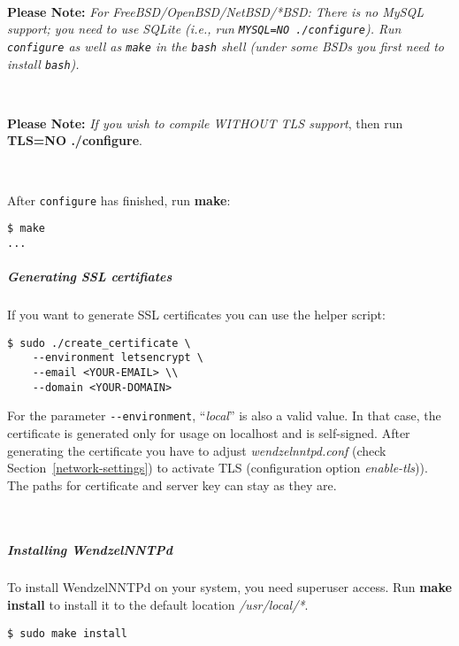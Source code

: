 \documentclass[12pt,fleqn,leqno]{scrbook}
\begin{document}
~

\textbf{Please Note:} \emph{For FreeBSD/OpenBSD/NetBSD/*BSD: There is no
MySQL support; you need to use SQLite (i.e., run
\texttt{MYSQL=NO\ ./configure}). Run \texttt{configure} as well as
\texttt{make} in the \texttt{bash} shell (under some BSDs you first need
to install \texttt{bash}).}

~

\textbf{Please Note:} \emph{If you wish to compile WITHOUT TLS support},
then run \textbf{TLS=NO ./configure}.

~

After \texttt{configure} has finished, run \textbf{make}:

\begin{verbatim}
$ make
...
\end{verbatim}

\hypertarget{generating-ssl-certifiates}{%
\subparagraph*{Generating SSL
certifiates}\label{generating-ssl-certifiates}}

If you want to generate SSL certificates you can use the helper script:

\begin{verbatim}
$ sudo ./create_certificate \
    --environment letsencrypt \
    --email <YOUR-EMAIL> \\
    --domain <YOUR-DOMAIN>
\end{verbatim}

For the parameter \texttt{-\/-environment}, ``\emph{local}'' is also a
valid value. In that case, the certificate is generated only for usage
on localhost and is self-signed. After generating the certificate you
have to adjust \emph{wendzelnntpd.conf} (check
Section~\protect\hyperlink{network-settings}{{[}network-settings{]}}) to
activate TLS (configuration option \emph{enable-tls})). The paths for
certificate and server key can stay as they are.

~

\hypertarget{installing-wendzelnntpd}{%
\subparagraph*{Installing WendzelNNTPd}\label{installing-wendzelnntpd}}

To install WendzelNNTPd on your system, you need superuser access. Run
\textbf{make install} to install it to the default location
\emph{/usr/local/*}.

\begin{verbatim}
$ sudo make install
\end{verbatim}
\end{document}
